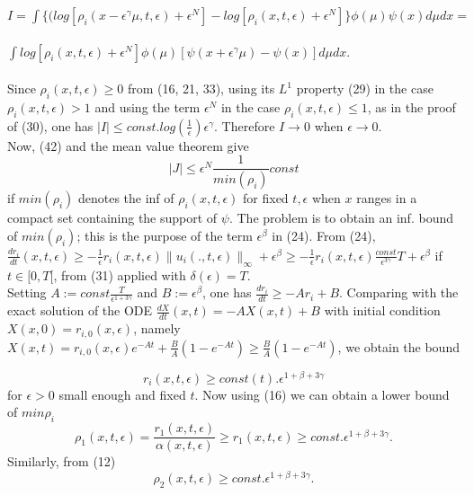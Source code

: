 \documentclass[a4paper,12pt]{article}
\begin{document}
  $I=\int\{(log[\rho_i(x-\epsilon^\gamma\mu,t,\epsilon)+\epsilon^N]-log[\rho_i(x,t,\epsilon)+\epsilon^N]\}\phi(\mu)\psi(x)d\mu dx=$\\
\\
  $\int log[\rho_i(x,t,\epsilon)+\epsilon^N]\phi(\mu)[\psi(x+\epsilon^\gamma\mu)-\psi(x)]d\mu dx.$\\
  \\
  Since $\rho_i(x,t,\epsilon)\geq 0$ from (16, 21, 33), using its $L^1$ property (29) in the case $\rho_i(x,t,\epsilon)>1$ and using the term $\epsilon^N$ in the case  $\rho_i(x,t,\epsilon)\leq1$, as in the proof of (30),  one has  $|I|\leq const.log(\frac{1}{\epsilon})\epsilon^\gamma$. Therefore $I\rightarrow 0$ when $\epsilon\rightarrow 0$.\\
  
  Now, (42) and the mean value theorem give %
  \begin{equation}|J|\leq \epsilon^N\frac{1}{min (\rho_i)} const\end{equation}
  if $min(\rho_i)$ denotes the inf of $\rho_i(x,t,\epsilon)$ for fixed  $t,\epsilon$ when $x$ ranges in a compact set containing the support of $\psi$.
  The problem is to obtain an inf. bound of $min(\rho_i)$; this is the purpose of the term $\epsilon^\beta$ in (24).  From  (24),
  $\frac{d r_i}{dt}(x,t,\epsilon)\geq-\frac{1}{\epsilon}r_i(x,t,\epsilon)\|u_i(.,t,\epsilon)\|_\infty +\epsilon^\beta \geq - \frac{1}{\epsilon}r_i(x,t,\epsilon)\frac{const}{\epsilon^{3\gamma}}T +\epsilon^\beta$ if $t\in [0,T[$, from (31) applied with $\delta(\epsilon)=T$.\\





  Setting $A:=const \frac{T}{\epsilon^{1+3\gamma}}$ and   $B:=\epsilon^\beta$, one has 
  $\frac{dr_i}{dt}\geq -Ar_i+B. $ Comparing with the exact solution of 
    the ODE $\frac{dX}{dt}(x,t)=-AX(x,t)+B$ with initial condition $X(x,0)=r_{i,0}(x,\epsilon)$,  namely
   $X(x,t)=r_{i,0}(x,\epsilon) e^{-At}+\frac{B}{A}(1-e^{-At})\geq \frac{B}{A}(1-e^{-At})$, we obtain the bound
  
  \begin{equation}r_i(x,t,\epsilon)\geq const(t).\epsilon^{1+\beta+3\gamma}\end{equation}
for $\epsilon>0$ small enough and fixed $t$.
Now using (16) we can obtain a lower bound of $min\rho_i$\\

 \begin{equation}\rho_1(x,t,\epsilon) =\frac{r_1(x,t,\epsilon)}{\alpha(x,t,\epsilon)}\geq r_1(x,t,\epsilon)\geq const. \epsilon^{1+\beta+3\gamma}. \end{equation}
Similarly, from (12)\begin{equation}\rho_2(x,t,\epsilon)  \geq const.\epsilon^{1+\beta+3\gamma}.\end{equation}
\end{document}
